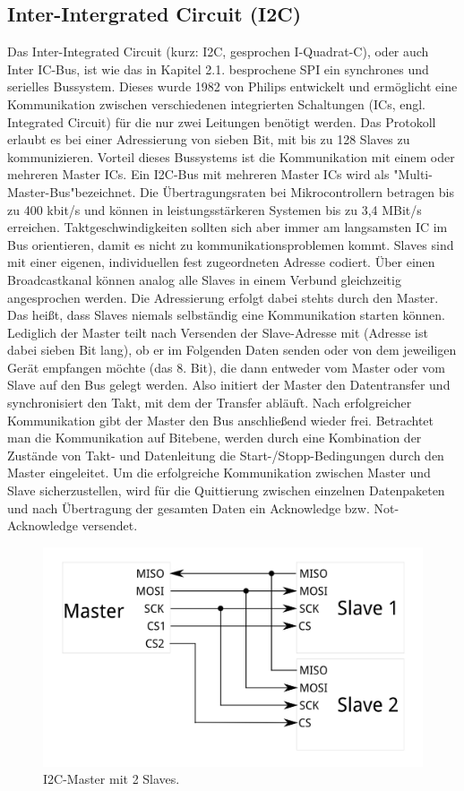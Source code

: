 \subsection{Inter-Intergrated Circuit (I2C)} \label{grund-i2c-subsubsec}


Das Inter-Integrated Circuit (kurz: I2C, gesprochen I-Quadrat-C), oder auch Inter IC-Bus, ist wie das in Kapitel 2.1. besprochene SPI ein synchrones und serielles Bussystem. Dieses wurde 1982  von Philips entwickelt und ermöglicht eine Kommunikation zwischen verschiedenen integrierten Schaltungen (ICs, engl. Integrated Circuit) für die nur zwei Leitungen benötigt werden. Das Protokoll erlaubt es bei einer Adressierung von sieben Bit, mit bis zu 128 Slaves zu kommunizieren. Vorteil dieses Bussystems ist die Kommunikation mit einem oder mehreren Master ICs. Ein I2C-Bus mit mehreren Master ICs wird als "Multi-Master-Bus"bezeichnet. Die Übertragungsraten bei Mikrocontrollern betragen bis zu 400 kbit/s und können in leistungsstärkeren Systemen bis zu 3,4 MBit/s erreichen. Taktgeschwindigkeiten sollten sich aber immer am langsamsten IC im Bus orientieren, damit es nicht zu kommunikationsproblemen kommt. Slaves sind mit einer eigenen, individuellen fest zugeordneten Adresse codiert. Über einen Broadcastkanal können analog alle Slaves in einem Verbund gleichzeitig angesprochen werden. Die Adressierung erfolgt dabei stehts durch den Master. Das heißt, dass Slaves niemals selbständig eine Kommunikation starten können. Lediglich der Master teilt nach Versenden der Slave-Adresse mit (Adresse ist dabei sieben Bit lang), ob er im Folgenden Daten senden oder von dem jeweiligen Gerät empfangen möchte (das 8. Bit), die dann entweder vom Master oder vom Slave auf den Bus gelegt werden. Also initiert der Master den Datentransfer und synchronisiert den Takt, mit dem der Transfer abläuft. Nach erfolgreicher Kommunikation gibt der Master den Bus anschließend wieder frei. Betrachtet man die Kommunikation auf Bitebene, werden durch eine Kombination der Zustände von Takt- und Datenleitung die Start-/Stopp-Bedingungen durch den Master eingeleitet. Um die erfolgreiche Kommunikation zwischen Master und Slave sicherzustellen, wird für die Quittierung zwischen einzelnen Datenpaketen und nach Übertragung der gesamten Daten ein Acknowledge bzw. Not-Acknowledge versendet.

\begin{figure}[H] \centering
\includegraphics[width=\textwidth]{Images/I2C_multiple_slaves.png} 
\vspace{-0.3cm} 
\caption{ I2C-Master mit 2 Slaves.}
\label{fig-elise} 
\end{figure}